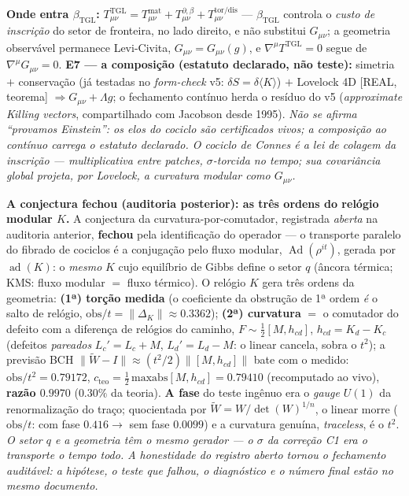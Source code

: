 \documentclass[11pt]{article}
\newcommand{\bTGL}{\beta_{\mathrm{TGL}}}\newcommand{\Msun}{M_{\odot}}\newcommand{\TGL}{\mathrm{TGL}}
\theoremstyle{definition}\newtheorem{deriv}{Derivação}
\begin{document}
\textbf{Onde entra $\bTGL$:} $T^{\mathrm{TGL}}_{\mu\nu}=T^{\mathrm{mat}}_{\mu\nu}+T^{\partial,\beta}_{\mu\nu}+T^{\mathrm{tor/dis}}_{\mu\nu}$ --- $\bTGL$ controla o \emph{custo de inscrição} do setor de fronteira, no lado direito, e não substitui $G_{\mu\nu}$; a geometria observável permanece Levi-Civita, $G_{\mu\nu}=G_{\mu\nu}(g)$, e $\nabla^\mu T^{\mathrm{TGL}}=0$ segue de $\nabla^\mu G_{\mu\nu}=0$. \textbf{E7 --- a composição (estatuto declarado, não teste):} simetria $+$ conservação (já testadas no \emph{form-check} v5: $\delta S=\delta\langle K\rangle$) $+$ Lovelock 4D \textsf{[REAL, teorema]} $\Rightarrow G_{\mu\nu}+\Lambda g$; o fechamento contínuo herda o resíduo do v5 (\emph{approximate Killing vectors}, compartilhado com Jacobson desde 1995). \emph{Não se afirma ``provamos Einstein'': os elos do cociclo são certificados vivos; a composição ao contínuo carrega o estatuto declarado. O cociclo de Connes é a lei de colagem da inscrição --- multiplicativa entre patches, $\sigma$-torcida no tempo; sua covariância global projeta, por Lovelock, a curvatura modular como $G_{\mu\nu}$.}

\textbf{A conjectura fechou (auditoria posterior): as três ordens do relógio modular $K$.} A conjectura da curvatura-por-comutador, registrada \emph{aberta} na auditoria anterior, \textbf{fechou} pela identificação do operador --- o transporte paralelo do fibrado de cociclos é a conjugação pelo fluxo modular, $\operatorname{Ad}(\rho^{it})$, gerada por $\operatorname{ad}(K)$: o \emph{mesmo} $K$ cujo equilíbrio de Gibbs define o setor $q$ (âncora térmica; KMS: fluxo modular $=$ fluxo térmico). O relógio $K$ gera três ordens da geometria: \textbf{(1ª) torção medida} (o coeficiente da obstrução de 1ª ordem \emph{é} o salto de relógio, $\mathrm{obs}/t=\lVert\Delta_K\rVert\approx0.3362$); \textbf{(2ª) curvatura} $=$ o comutador do defeito com a diferença de relógios do caminho, $F\sim\tfrac12[M,h_{cd}]$, $h_{cd}=K_d-K_c$ (defeitos \emph{pareados} $L_c'=L_c+M$, $L_d'=L_d-M$: o linear cancela, sobra o $t^2$); a previsão BCH $\lVert\tilde W-I\rVert\approx(t^2/2)\lVert[M,h_{cd}]\rVert$ bate com o medido: $\mathrm{obs}/t^2=0.79172$, $c_{\mathrm{teo}}=\tfrac12\,\mathrm{maxabs}[M,h_{cd}]=0.79410$ (recomputado ao vivo), \textbf{razão $0.9970$} ($0.30\%$ da teoria). \textbf{A fase} do teste ingênuo era o \emph{gauge} $U(1)$ da renormalização do traço; quocientada por $\tilde W=W/\det(W)^{1/n}$, o linear morre ($\mathrm{obs}/t$: com fase $0.416\to$ sem fase $0.0099$) e a curvatura genuína, \emph{traceless}, é o $t^2$. \emph{O setor $q$ e a geometria têm o mesmo gerador --- o $\sigma$ da correção C1 era o transporte o tempo todo. A honestidade do registro aberto tornou o fechamento auditável: a hipótese, o teste que falhou, o diagnóstico e o número final estão no mesmo documento.}
\end{document}
